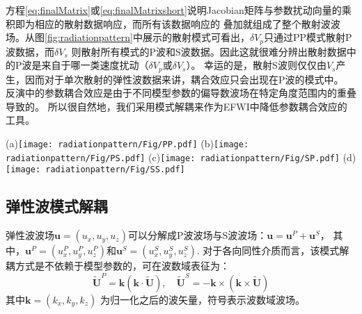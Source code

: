 方程\eqref{eq:finalMatrix}或\eqref{eq:finalMatrixshort}说明Jacobian矩阵与参数扰动向量的乘积即为相应的散射数据响应，而所有该数据响应的
叠加就组成了整个散射波波场。从图\ref{fig:radiationpattern}中展示的散射模式可看出，$\delta V_p$只通过PP模式散射P波数据，而$\delta V_s$
则散射所有模式的P波和S波数据。因此这就很难分辨出散射数据中的P波是来自于哪一类速度扰动（$\delta V_p$或$\delta V_s$）。
幸运的是，散射S波则仅仅由$V_s$产生，因而对于单次散射的弹性波数据来讲，耦合效应只会出现在P波的模式中。
反演中的参数耦合效应是由于不同模型参数的偏导数波场在特定角度范围内的重叠导致的\cite{tarantola:1986,operto2013guided}。
所以很自然地，我们采用模式解耦来作为EFWI中降低参数耦合效应的工具。
\begin{figure*}
    \begin{center}
        \subfloat(a){\texttt{[image: radiationpattern/Fig/PP.pdf]}}
        \subfloat(b){\texttt{[image: radiationpattern/Fig/PS.pdf]}}
        \subfloat(c){\texttt{[image: radiationpattern/Fig/SP.pdf]}}
        \subfloat(d){\texttt{[image: radiationpattern/Fig/SS.pdf]}}
        \caption{The radiation patterns of $V_p$
        (red) and $V_s$ (blue) perturbations. (a) PP, (b) PS, (c) SP and (d) SS modes.
    }
    \label{fig:radiationpattern} 
    \end{center}
\end{figure*} 

\subsection{弹性波模式解耦}
弹性波波场$\mathbf{u}=(u_x,u_y,u_z)$可以分解成P波波场与S波波场：$\mathbf{u}=\mathbf{u}^P+\mathbf{u}^S$，
其中，$\mathbf{u}^P=(u^P_x,u^P_y,u^P_z)$和$\mathbf{u}^S=(u^S_x,u^S_y,u^S_z)$.
对于各向同性介质而言，该模式解耦方式是不依赖于模型参数的，可在波数域表征为\cite[]{zhang.mcmechan:2010}：
\begin{equation}
        \tilde{\mathbf U}^P=\mathbf k(\mathbf k\cdot \tilde{\mathbf U}), \quad
        \tilde{\mathbf U}^S=-\mathbf 
        k\times(\mathbf k\times \tilde{\mathbf U})
\label{eq:Decomp}
\end{equation}
其中$\mathbf k=(k_x,k_y,k_z)$ 为归一化之后的波矢量，符号$\tilde{}$表示波数域波场。

